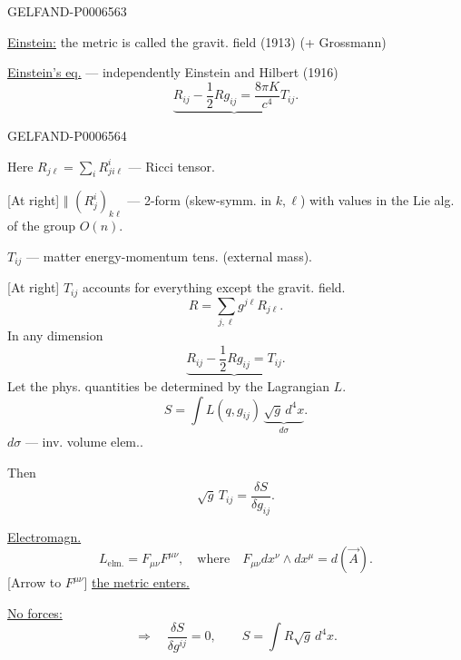 \begin{GelfandAdjacentEvidence}{GELFAND-P000656}{3}


\underline{Einstein:} the metric is called the gravit. field (1913) (+ Grossmann)

\underline{Einstein’s eq.} --- independently Einstein and Hilbert (1916)
\[
\underbrace{R_{ij}-\frac12Rg_{ij}=\frac{8\pi K}{c^4}T_{ij}}.
\]
\end{GelfandAdjacentEvidence}
\begin{GelfandAdjacentEvidence}{GELFAND-P000656}{4}


Here \(R_{j\ell}=\sum_i R^i_{ji\ell}\) --- Ricci tensor.

[At right] \(\Vert\) \((R^i_j)_{k\ell}\) --- 2-form
(skew-symm. in \(k,\ell\)) with values in the Lie alg. of the group \(O(n)\).

\(T_{ij}\) --- matter energy-momentum tens. (external mass).

[At right] \(T_{ij}\) accounts for everything except the gravit. field.
\[
R=\sum_{j,\ell}g^{j\ell}R_{j\ell}.
\]
In any dimension
\[
\underbrace{R_{ij}-\frac12Rg_{ij}=T_{ij}}.
\]
Let the phys. quantities be determined by the Lagrangian \(L\).
\[
S=\int L(q,g_{ij})\,\underbrace{\sqrt g\,d^4x}_{d\sigma}.
\]
\(d\sigma\) --- inv. volume elem..

Then
\[
\sqrt g\,T_{ij}=\frac{\delta S}{\delta g_{ij}}.
\]
\end{GelfandAdjacentEvidence}


\underline{Electromagn.}
\[
L_{\text{elm.}}=F_{\mu\nu}F^{\mu\nu},\quad
\text{where}\quad F_{\mu\nu}dx^\nu\wedge dx^\mu=d(\vec A).
\]
[Arrow to \(F^{\mu\nu}\)] \underline{the metric enters.}

\underline{No forces:}
\[
\Longrightarrow\quad\frac{\delta S}{\delta g^{ij}}=0,
\qquad S=\int R\sqrt g\,d^4x.
\]


